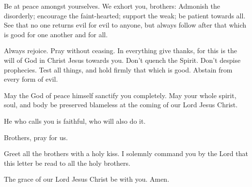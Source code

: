 Be at peace amongst yourselves.  We exhort you, brothers:
Admonish the disorderly; encourage the faint-hearted; support the weak;
be patient towards all.  See that no one returns evil for
evil to anyone, but always follow after that which is good for one
another and for all.

 Always rejoice.  Pray without ceasing.
 In everything give thanks, for this is the will of God
in Christ Jesus towards you.  Don't quench the Spirit.
 Don't despise prophecies.  Test all
things, and hold firmly that which is good.  Abstain from
every form of evil.

 May the God of peace himself sanctify you completely.
May your whole spirit, soul, and body be preserved blameless at the
coming of our Lord Jesus Christ.

 He who calls you is faithful, who will also do it.

 Brothers, pray for us.

 Greet all the brothers with a holy kiss. 
I solemnly command you by the Lord that this letter be read to all the
holy brothers.

 The grace of our Lord Jesus Christ be with you. Amen.
